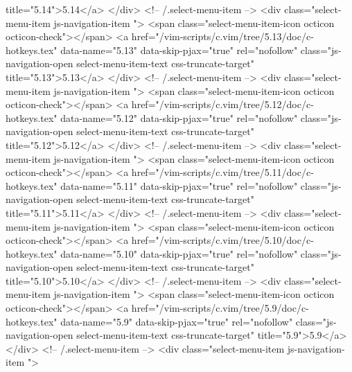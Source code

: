                  title="5.14">5.14</a>
            </div> <!-- /.select-menu-item -->
            <div class="select-menu-item js-navigation-item ">
              <span class="select-menu-item-icon octicon octicon-check"></span>
              <a href="/vim-scripts/c.vim/tree/5.13/doc/c-hotkeys.tex"
                 data-name="5.13"
                 data-skip-pjax="true"
                 rel="nofollow"
                 class="js-navigation-open select-menu-item-text css-truncate-target"
                 title="5.13">5.13</a>
            </div> <!-- /.select-menu-item -->
            <div class="select-menu-item js-navigation-item ">
              <span class="select-menu-item-icon octicon octicon-check"></span>
              <a href="/vim-scripts/c.vim/tree/5.12/doc/c-hotkeys.tex"
                 data-name="5.12"
                 data-skip-pjax="true"
                 rel="nofollow"
                 class="js-navigation-open select-menu-item-text css-truncate-target"
                 title="5.12">5.12</a>
            </div> <!-- /.select-menu-item -->
            <div class="select-menu-item js-navigation-item ">
              <span class="select-menu-item-icon octicon octicon-check"></span>
              <a href="/vim-scripts/c.vim/tree/5.11/doc/c-hotkeys.tex"
                 data-name="5.11"
                 data-skip-pjax="true"
                 rel="nofollow"
                 class="js-navigation-open select-menu-item-text css-truncate-target"
                 title="5.11">5.11</a>
            </div> <!-- /.select-menu-item -->
            <div class="select-menu-item js-navigation-item ">
              <span class="select-menu-item-icon octicon octicon-check"></span>
              <a href="/vim-scripts/c.vim/tree/5.10/doc/c-hotkeys.tex"
                 data-name="5.10"
                 data-skip-pjax="true"
                 rel="nofollow"
                 class="js-navigation-open select-menu-item-text css-truncate-target"
                 title="5.10">5.10</a>
            </div> <!-- /.select-menu-item -->
            <div class="select-menu-item js-navigation-item ">
              <span class="select-menu-item-icon octicon octicon-check"></span>
              <a href="/vim-scripts/c.vim/tree/5.9/doc/c-hotkeys.tex"
                 data-name="5.9"
                 data-skip-pjax="true"
                 rel="nofollow"
                 class="js-navigation-open select-menu-item-text css-truncate-target"
                 title="5.9">5.9</a>
            </div> <!-- /.select-menu-item -->
            <div class="select-menu-item js-navigation-item ">
